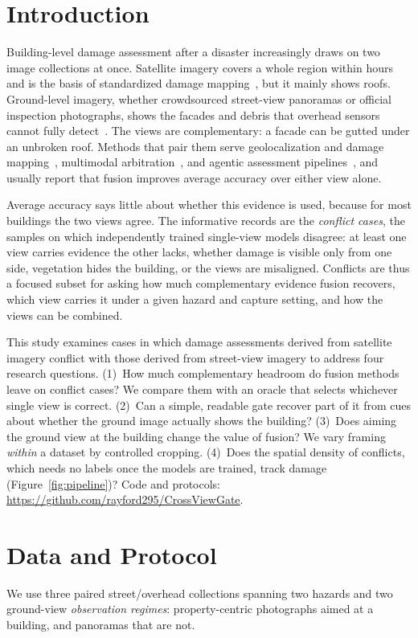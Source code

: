 \documentclass[sigconf]{acmart}
\begin{document}
\section{Introduction}
Building-level damage assessment after a disaster increasingly draws on two
image collections at once. Satellite imagery covers a whole region within
hours and is the basis of standardized damage
mapping~\cite{gupta2019creating}, but it mainly shows roofs. Ground-level
imagery, whether crowdsourced street-view panoramas or official inspection
photographs, shows the facades and debris that overhead sensors cannot
fully detect~\cite{zhai2020damage,yang2025hyperlocal}. The views are
complementary: a facade can be gutted under an unbroken roof. Methods that
pair them serve geolocalization and damage
mapping~\cite{li2025cross,yin2026triple,li2026towards}, multimodal
arbitration~\cite{yang2026damagearbiter}, and agentic assessment
pipelines~\cite{yang2026rapid,yang2026rapidmap}, and usually report that
fusion improves average accuracy over either view alone.

Average accuracy says little about whether this evidence is used, because
for most buildings the two views agree. The informative
records are the \emph{conflict cases}, the samples on which independently
trained single-view models disagree: at least one view carries evidence the
other lacks, whether damage is visible only from one side, vegetation hides
the building, or the views are misaligned. Conflicts are thus a focused
subset for asking how much complementary evidence fusion recovers, which
view carries it under a given hazard and capture setting, and how the views
can be combined.

This study examines cases in which damage assessments derived from
satellite imagery conflict with those derived from street-view imagery to
address four research questions. (1)~How much complementary headroom do
fusion methods leave on conflict cases? We compare them with an oracle that
selects whichever single view is correct. (2)~Can a simple, readable gate
recover part of it from cues about whether the ground image actually shows
the building? (3)~Does aiming the ground view at the building change the
value of fusion? We vary framing \emph{within} a dataset by controlled
cropping. (4)~Does the spatial density of conflicts,
which needs no labels once the models are trained, track damage
(Figure~\ref{fig:pipeline})? Code and protocols:
\url{https://github.com/rayford295/CrossViewGate}.

\section{Data and Protocol}
We use three paired street/overhead collections spanning two hazards and
two ground-view \emph{observation regimes}: property-centric
photographs aimed at a building, and panoramas that are not.
\end{document}

